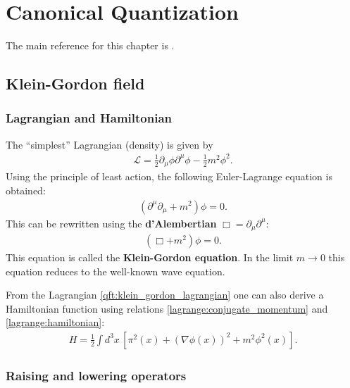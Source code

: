 \chapter{Canonical Quantization}

    The main reference for this chapter is \cite{Peskin}.

\section{Klein-Gordon field}
\subsection{Lagrangian and Hamiltonian}

    The ``simplest'' Lagrangian (density) is given by
    \begin{gather}
        \label{qft:klein_gordon_lagrangian}
        \mathcal{L} = \frac{1}{2}\partial_\mu\phi\partial^\mu\phi - \frac{1}{2}m^2\phi^2.
    \end{gather}
    Using the principle of least action, the following Euler-Lagrange equation is obtained:
    \begin{gather}
        \left(\partial^\mu\partial_\mu + m^2\right)\phi = 0.
    \end{gather}
    This can be rewritten using the \textbf{d'Alembertian} $\Box = \partial_\mu\partial^\mu$:
    \begin{gather}
        \label{qft:klein_gordon_equation}
        (\Box+m^2)\phi = 0.
    \end{gather}
    This equation is called the \textbf{Klein-Gordon equation}. In the limit $m\rightarrow0$ this equation reduces to the well-known wave equation.

    From the Lagrangian \eqref{qft:klein_gordon_lagrangian} one can also derive a Hamiltonian function using relations \ref{lagrange:conjugate_momentum} and \ref{lagrange:hamiltonian}:
    \begin{gather}
        \label{qft:klein_gordon_hamiltonian}
        H = \frac{1}{2}\int d^3x\,\left[\pi^2(x) + (\nabla\phi(x))^2 + m^2\phi^2(x)\right].
    \end{gather}

\subsection{Raising and lowering operators}

